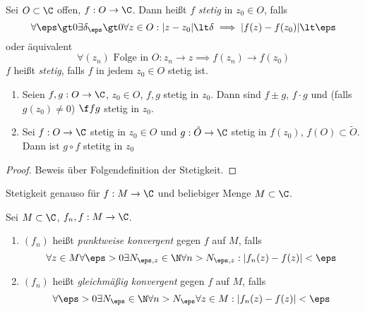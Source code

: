 \documentclass[a4paper,10pt]{scrartcl}
\begin{document}
\begin{df}
	\label{df:1.9}
	Sei $O\subset \C$ offen, $f: O \to \C$.
	Dann heißt $f$ \emph{stetig} in $z_0\in O$, falls
	\[
		\forall \eps\gt 0 \exists \delta_\eps \gt 0 \forall z\in O : |z-z_0| \lt \delta \implies |f(z) -f(z_0)| \lt \eps
	\]
	oder äquivalent
	\[
		\forall (z_n) \text{ Folge in } O: z_n \to z \implies f(z_n) \to f(z_0)
	\]
	$f$ heißt \emph{stetig}, falls $f$ in jedem $z_0\in O$ stetig ist.
\end{df}

\begin{st}
	\label{st:1.10}
	\begin{enumerate}
		\item 
			Seien $f,g: O\to \C$, $z_0\in O$, $f,g$ stetig in $z_0$.
			Dann sind $f\pm g$, $f\cdot g$ und (falls $g(z_0)\neq 0$) $\f fg$ stetig in $z_0$.
		\item
			Sei $f:O\to \C$ stetig in $z_0\in O$ und $g:\tilde O \to \C$ stetig in $f(z_0)$, $f(O) \subset \tilde O$.
			Dann ist $g\circ f$ stetitg in $z_0$
	\end{enumerate}
\end{st}
\begin{proof}
Beweis über Folgendefinition der Stetigkeit.
\end{proof}

\begin{nt}
	\label{nt:1.10}
	Stetigkeit genauso für $f:M\to \C$ und beliebiger Menge $M\subset \C$.
\end{nt}

\begin{df}[Funktionenfolgen]
	Sei $M\subset \C$, $f_n,f: M \to \C$.
	\begin{enumerate}[1)]
		\item 
			$(f_n)$ heißt \emph{punktweise konvergent} gegen $f$ auf $M$, falls
			\[
				\forall z\in M \forall \eps > 0 \exists N_{\eps,z} \in \N \forall n>N_{\eps,z}: |f_n(z) - f(z)| < \eps
			\]
		\item
			$(f_n)$ heißt \emph{gleichmäßig konvergent} gegen $f$ auf $M$, falls
			\[
				\forall \eps>0 \exists N_{\eps} \in \N \forall n>N_{\eps} \forall z\in M : |f_n(z)-f(z)| < \eps
			\]
	\end{enumerate}
\end{df}
\end{document}
